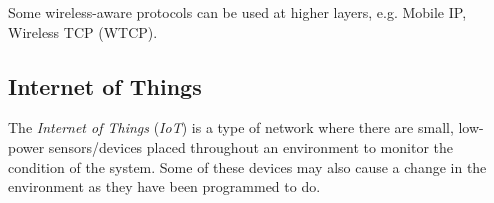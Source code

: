 \begin{remark*}
  Some wireless-aware protocols can be used at higher layers, e.g. Mobile IP, Wireless TCP (WTCP).
\end{remark*}

\subsection{Internet of Things}\label{subsec:IoT}
\begin{definition}\label{def:IoT}
  The \emph{Internet of Things} (\emph{IoT}) is a type of network where there are small, low-power sensors/devices placed throughout an environment to monitor the condition of the system.
  Some of these devices may also cause a change in the environment as they have been programmed to do.
\end{definition}

